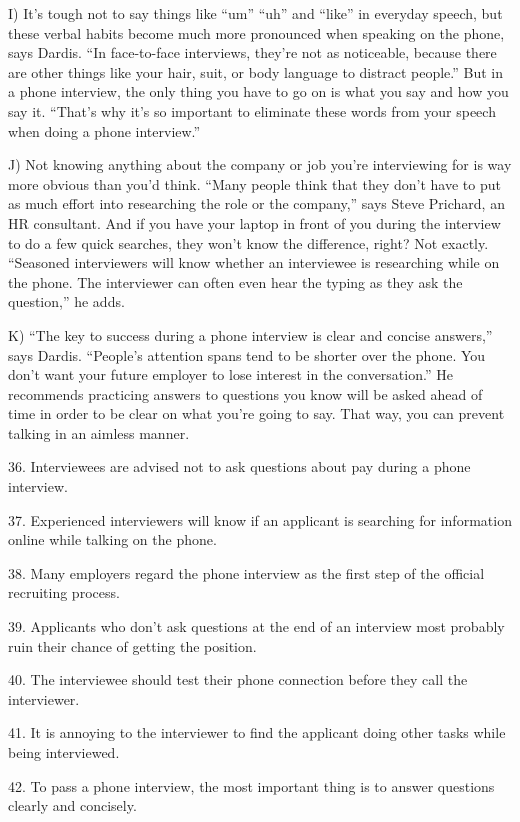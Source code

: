 \documentclass[UTF8,11pt]{ctexart}
\begin{document}
I) It’s tough not to say things like “um” “uh” and “like” in everyday speech, but these verbal habits become much more pronounced when speaking on the phone, says Dardis. “In face-to-face interviews, they’re not as noticeable, because there are other things like your hair, suit, or body language to distract people.” But in a phone interview, the only thing you have to go on is what you say and how you say it. “That’s why it’s so important to eliminate these words from your speech when doing a phone interview.”


J) Not knowing anything about the company or job you’re interviewing for is way more obvious than you’d think. “Many people think that they don’t have to put as much effort into researching the role or the company,” says Steve Prichard, an HR consultant. And if you have your laptop in front of you during the interview to do a few quick searches, they won’t know the difference, right? Not exactly. “Seasoned interviewers will know whether an interviewee is researching while on the phone. The interviewer can often even hear the typing as they ask the question,” he adds.


K) “The key to success during a phone interview is clear and concise answers,” says Dardis. “People’s attention spans tend to be shorter over the phone. You don’t want your future employer to lose interest in the conversation.” He recommends practicing answers to questions you know will be asked ahead of time in order to be clear on what you’re going to say. That way, you can prevent talking in an aimless manner.


36. Interviewees are advised not to ask questions about pay during a phone interview.


37. Experienced interviewers will know if an applicant is searching for information online while talking on the phone.


38. Many employers regard the phone interview as the first step of the official recruiting process.


39. Applicants who don’t ask questions at the end of an interview most probably ruin their chance of getting the position.


40. The interviewee should test their phone connection before they call the interviewer.


41. It is annoying to the interviewer to find the applicant doing other tasks while being interviewed.


42. To pass a phone interview, the most important thing is to answer questions clearly and concisely.
\end{document}
